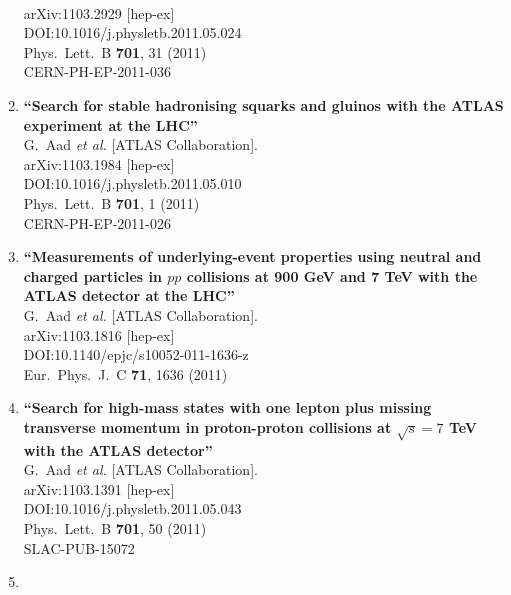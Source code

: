\documentclass{article}
\begin{document}
\begin{enumerate}
  \\{}arXiv:1103.2929 [hep-ex]
  \\{}DOI:10.1016/j.physletb.2011.05.024
  \\{}Phys.\ Lett.\ B {\bf 701}, 31 (2011)
  \\{}CERN-PH-EP-2011-036
\item%
{\bf ``Search for stable hadronising squarks and gluinos with the ATLAS experiment at the LHC''}
  \\{}G.~Aad {\it et al.} [ATLAS Collaboration].
  \\{}arXiv:1103.1984 [hep-ex]
  \\{}DOI:10.1016/j.physletb.2011.05.010
  \\{}Phys.\ Lett.\ B {\bf 701}, 1 (2011)
  \\{}CERN-PH-EP-2011-026
\item%
{\bf ``Measurements of underlying-event properties using neutral and charged particles in $pp$ collisions at 900 GeV and 7 TeV with the ATLAS detector at the LHC''}
  \\{}G.~Aad {\it et al.} [ATLAS Collaboration].
  \\{}arXiv:1103.1816 [hep-ex]
  \\{}DOI:10.1140/epjc/s10052-011-1636-z
  \\{}Eur.\ Phys.\ J.\ C {\bf 71}, 1636 (2011)
\item%
{\bf ``Search for high-mass states with one lepton plus missing transverse momentum in proton-proton collisions at $\sqrt{s} = 7$ TeV with the ATLAS detector''}
  \\{}G.~Aad {\it et al.} [ATLAS Collaboration].
  \\{}arXiv:1103.1391 [hep-ex]
  \\{}DOI:10.1016/j.physletb.2011.05.043
  \\{}Phys.\ Lett.\ B {\bf 701}, 50 (2011)
  \\{}SLAC-PUB-15072
\item%

\end{enumerate}
\end{document}
